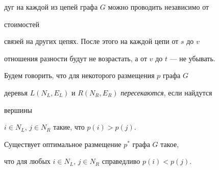 дуг на каждой из цепей графа $G$ можно проводить независимо от


стоимостей


связей на других цепях. После этого на каждой цепи от $s$ до $v$


отношения разности будут не возрастать, а от $v$ до $t$ --- не убывать.





Будем говорить, что для некоторого размещения $p$ графа $G$


деревья $L(N_L,E_L)$ и $R(N_R,E_R)$ {\em пересекаются}, если найдутся


вершины


$i\in N_L$, $j\in N_R$ такие, что $p(i)>p(j)$.





\begin{thm} Существует оптимальное размещение $p^*$ графа $G$ такое,


что для любых $i\in N_L$, $j\in N_R$ справедливо $p(i)<p(j)$.


\end{thm}





